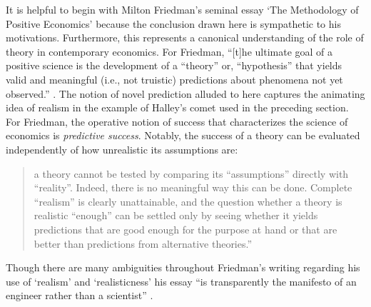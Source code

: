 It is helpful to begin with Milton Friedman's \autocite*{friedman1953} seminal essay `The Methodology of Positive Economics' because the conclusion drawn here is sympathetic to his motivations. Furthermore, this represents a canonical understanding of the role of theory in contemporary economics. For Friedman, ``[t]he ultimate goal of a positive science is the development of a ``theory'' or, ``hypothesis'' that yields valid and meaningful (i.e., not truistic) predictions about phenomena not yet observed.'' \autocite[7]{friedman1953}. The notion of novel prediction alluded to here captures the animating idea of realism in the example of Halley's comet used in the preceding section. For Friedman, the operative notion of success that characterizes the science of economics is \textit{predictive success}. Notably, the success of a theory can be evaluated independently of how unrealistic its assumptions are:
\begin{quote}
    a theory cannot be tested by comparing its ``assumptions'' directly with ``reality''. Indeed, there is no meaningful way this can be done. Complete ``realism'' is clearly unattainable, and the question whether a theory is realistic ``enough'' can be settled only by seeing whether it yields predictions that are good enough for the purpose at hand or that are better than predictions from alternative theories.'' \autocite[41]{friedman1953}
\end{quote}
\noindent Though there are many ambiguities throughout Friedman's writing regarding his use of `realism' and `realisticness' his essay ``is transparently the manifesto of an engineer rather than a scientist'' \autocite[740]{ross2008}. 


